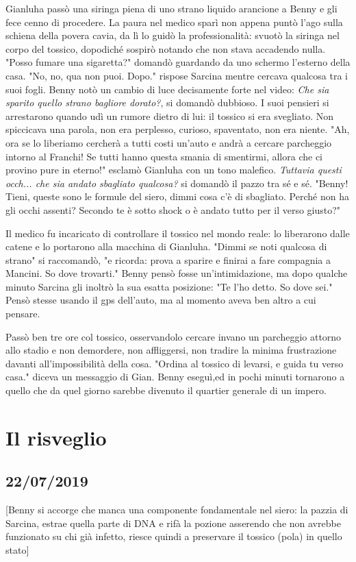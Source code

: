 Gianluha passò una siringa piena di uno strano liquido arancione a Benny e gli fece cenno di procedere.
La paura nel medico sparì non appena puntò l'ago sulla schiena della povera cavia, da lì lo guidò la professionalità: svuotò la siringa nel corpo del tossico, dopodiché sospirò notando che non stava accadendo nulla.
"Posso fumare una sigaretta?" domandò guardando da uno schermo l'esterno della casa.
"No, no, qua non puoi. Dopo." rispose Sarcina mentre cercava qualcosa tra i suoi fogli. 
Benny notò un cambio di luce decisamente forte nel video: \textit{Che sia sparito quello strano bagliore dorato?}, si domandò dubbioso.
I suoi pensieri si arrestarono quando udì un rumore dietro di lui: il tossico si era svegliato. 
Non spiccicava una parola, non era perplesso, curioso, spaventato, non era niente.
"Ah, ora se lo liberiamo cercherà a tutti costi un'auto e andrà a cercare parcheggio intorno al Franchi! Se tutti hanno questa smania di smentirmi, allora che ci provino pure in eterno!" esclamò Gianluha con un tono malefico.
\textit{Tuttavia questi occh... che sia andato sbagliato qualcosa?} si domandò il pazzo tra sé e sé.
"Benny! Tieni, queste sono le formule del siero, dimmi cosa c'è di sbagliato.
Perché non ha gli occhi assenti? Secondo te è sotto shock o è andato tutto per il verso giusto?"

Il medico fu incaricato di controllare il tossico nel mondo reale: lo liberarono dalle catene e lo portarono alla macchina di Gianluha. 
"Dimmi se noti qualcosa di strano" si raccomandò, "e ricorda: prova a sparire e finirai a fare compagnia a Mancini. So dove trovarti."
Benny pensò fosse un'intimidazione, ma dopo qualche minuto Sarcina gli inoltrò la sua esatta posizione: "Te l'ho detto. So dove sei."
Pensò stesse usando il gps dell'auto, ma al momento aveva ben altro a cui pensare.

Passò ben tre ore col tossico, osservandolo cercare invano un parcheggio attorno allo stadio e non demordere, non affliggersi, non tradire la minima frustrazione davanti all'impossibilità della cosa.
"Ordina al tossico di levarsi, e guida tu verso casa." diceva un messaggio di Gian.
Benny eseguì,ed in pochi minuti tornarono a quello che da quel giorno sarebbe divenuto il quartier generale di un impero.

\section{Il risveglio}
\subsection*{22/07/2019}
[Benny si accorge che manca una componente fondamentale nel siero: la pazzia di Sarcina, estrae quella parte di DNA e rifà la pozione asserendo che non avrebbe funzionato su chi già infetto, riesce quindi a preservare il tossico (pola) in quello stato] 


